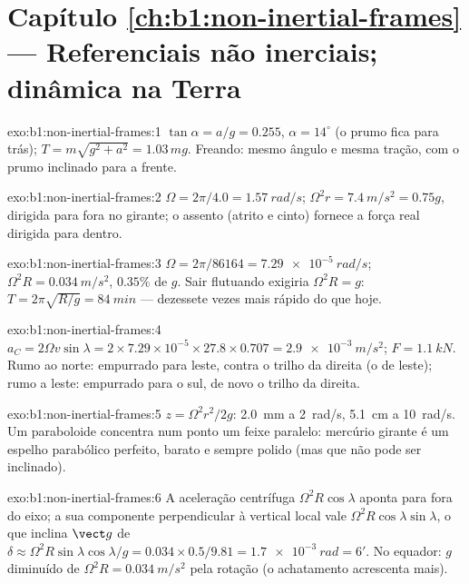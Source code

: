 \section*{Capítulo \ref{ch:b1:non-inertial-frames} --- Referenciais não inerciais; dinâmica na Terra}

\begin{solution}{exo:b1:non-inertial-frames:1}
$\tan\alpha = a/g = 0.255$, $\alpha = 14^\circ$ (o prumo fica para trás);
$T = m\sqrt{g^2 + a^2} = 1.03\,mg$. Freando: mesmo ângulo e mesma tração,
com o prumo inclinado para a frente.
\end{solution}

\begin{solution}{exo:b1:non-inertial-frames:2}
$\Omega = 2\pi/4.0 = \qty{1.57}{rad/s}$; $\Omega^2r = \qty{7.4}{m/s^2} = 0.75g$,
dirigida para fora no  girante; o assento (atrito e cinto)
fornece a força real dirigida para dentro.
\end{solution}

\begin{solution}{exo:b1:non-inertial-frames:3}
$\Omega = 2\pi/86164 = \qty{7.29e-5}{rad/s}$; $\Omega^2R = \qty{0.034}{m/s^2}$,
$0.35\%$ de $g$. Sair flutuando exigiria $\Omega^2R = g$: $T = 2\pi\sqrt{R/g} =
\qty{84}{min}$ --- dezessete vezes mais rápido do que hoje.
\end{solution}

\begin{solution}{exo:b1:non-inertial-frames:4}
$a_C = 2\Omega v\sin\lambda = 2 \times 7.29\times10^{-5} \times 27.8 \times 0.707
= \qty{2.9e-3}{m/s^2}$; $F = \qty{1.1}{kN}$. Rumo ao norte: empurrado para
leste, contra o trilho da direita (o de leste); rumo a leste: empurrado
para o sul, de novo o trilho da direita.
\end{solution}

\begin{solution}{exo:b1:non-inertial-frames:5}
$z = \Omega^2r^2/2g$: \qty{2.0}{mm} a \qty{2}{rad/s}, \qty{5.1}{cm} a
\qty{10}{rad/s}. Um paraboloide concentra num ponto um feixe paralelo:
mercúrio girante é um espelho parabólico perfeito, barato e sempre polido
(mas que não pode ser inclinado).
\end{solution}

\begin{solution}{exo:b1:non-inertial-frames:6}
A aceleração centrífuga $\Omega^2R\cos\lambda$ aponta para fora do eixo; a sua
componente perpendicular à vertical local vale $\Omega^2R\cos\lambda
\sin\lambda$, o que inclina $\vect g$ de $\delta \approx \Omega^2R\sin\lambda\cos\lambda/g
= 0.034 \times 0.5/9.81 = \qty{1.7e-3}{rad} = 6'$. No equador: $g$ diminuído de
$\Omega^2R = \qty{0.034}{m/s^2}$ pela rotação (o achatamento acrescenta mais).
\end{solution}

